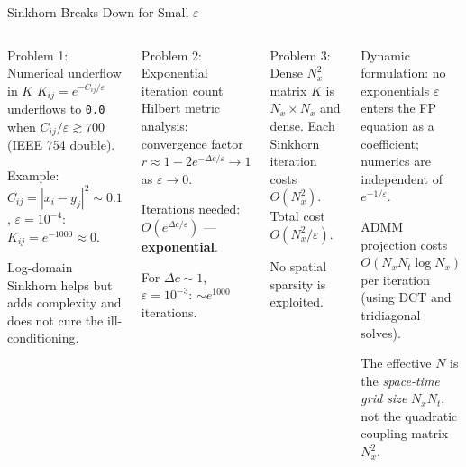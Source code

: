 \documentclass[10pt,aspectratio=169]{beamer}
\newcommand{\eps}{\varepsilon}
\begin{document}
\begin{frame}{Sinkhorn Breaks Down for Small $\eps$}
  \begin{columns}[T]
    \begin{alertblock}{Problem 1: Numerical underflow in $K$}
      $K_{ij} = e^{-C_{ij}/\eps}$ underflows to \texttt{0.0}
      when $C_{ij}/\eps \gtrsim 700$ (IEEE 754 double).

      \smallskip
      Example: $C_{ij} = |x_i - y_j|^2 \sim 0.1$,
      $\eps = 10^{-4}$:
      $K_{ij} = e^{-1000} \approx 0$.

      \smallskip
      Log-domain Sinkhorn helps but adds complexity and
      does not cure the ill-conditioning.
    \end{alertblock}

    \begin{alertblock}{Problem 2: Exponential iteration count}
      Hilbert metric analysis: convergence factor
      $r \approx 1 - 2e^{-\Delta c/\eps} \to 1$ as $\eps\to 0$.

      \smallskip
      Iterations needed: $O(e^{\Delta c/\eps})$ — \textbf{exponential}.

      \smallskip
      For $\Delta c \sim 1$, $\eps = 10^{-3}$: $\sim e^{1000}$ iterations.
    \end{alertblock}

    \begin{alertblock}{Problem 3: Dense $N_x^2$ matrix}
      $K$ is $N_x \times N_x$ and dense.
      Each Sinkhorn iteration costs $O(N_x^2)$.
      Total cost $O(N_x^2/\eps)$.

      \smallskip
      No spatial sparsity is exploited.
    \end{alertblock}

    \begin{block}{Dynamic formulation: no exponentials}
      $\eps$ enters the FP equation as a coefficient;
      numerics are independent of $e^{-1/\eps}$.

      \smallskip
      ADMM projection costs $O(N_x N_t\log N_x)$
      per iteration (using DCT and tridiagonal solves).

      \smallskip
      The effective $N$ is the \emph{space-time grid size}
      $N_x N_t$, not the quadratic coupling matrix $N_x^2$.
    \end{block}
  \end{columns}
\end{frame}
\end{document}
